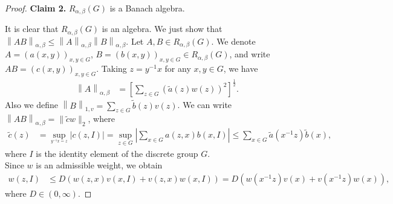 \documentclass[preprint,11pt]{elsarticle}
\numberwithin{equation}{section}
\begin{document}
\begin{proof}
		\textbf{Claim 2.} $R_{\alpha,\beta }(G)$ is a Banach algebra.
		
		It is clear that $R_{\alpha,\beta }(G)$ is an algebra. We just show that $\left \| AB \right \|_{\alpha,\beta }\le \left \| A \right \|_{\alpha,\beta }\left \| B \right \|_{\alpha,\beta }$.
		Let $A,B\in R_{\alpha,\beta }(G) $.
		We denote  $A=(a(x,y))_{x,y\in G}$, $B=(b(x,y))_{x,y\in G}\in R_{\alpha,\beta }(G)$, and write $AB=(c(x,y))_{x,y\in G}$.
		Taking $z = y^{-1}x$ for any $  x, y \in  G$, 
		we have 
		\begin{align*}
			\left \| A\right \| _{\alpha,\beta} &%
			= [\sum _{z\in G} 
			(\tilde {a}(z)w(z))^{2}  ]^\frac{1}{2}.
		\end{align*}
		Also we define $\left \| B\right \| _{1 ,v }= {\sum_{z\in G}  \tilde {b}\left (z \right )v(z)}$.
		We can write $\left \| AB \right \|_{\alpha,\beta }= \|  \tilde {c}w \|_{2}$, where
		\begin{align*}
			\tilde{c}(z)&=\sup_{_{ y^{-1}x=z } }  |c(z,I)  |=\sup_{z\in G } |\sum_{x\in G}a(z,x)b(x,I)  |\le \sum_{x\in G}\tilde{a}(x^{-1}z)\tilde{b}(x),
		\end{align*}
		where $I$ is the identity element of the discrete group $G$.\\
		Since $w$ is an admissible weight, we obtain
		\begin{align*}
			w(z,I)&\le D(w(z,x)v(x,I)+v(z,x)w(x,I))=D\left(w(x^{-1}z)v(x)+v(x^{-1}z)w(x)\right),
		\end{align*}
		where $D\in (0,\infty)$.
		

\end{proof}
\end{document}
